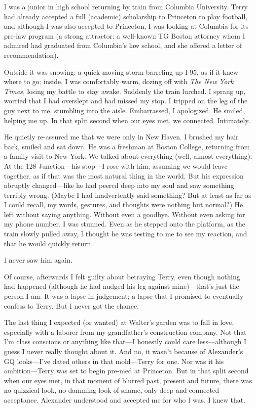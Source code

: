 I was a junior in high school returning by train from Columbia
University. Terry had already accepted a full (academic) scholarship to
Princeton to play football, and although I was also accepted to
Princeton, I was looking at Columbia for its pre-law program (a strong
attractor: a well-known TG Boston attorney whom I admired had graduated
from Columbia's law school, and she offered a letter of recommendation).

Outside it was snowing: a quick-moving storm barreling up I-95, as if it
knew where to go; inside, I was comfortably warm, dozing off with
\emph{The New York Times,} losing my battle to stay awake. Suddenly the
train lurched. I sprang up, worried that I had overslept and had missed
my stop. I tripped on the leg of the guy next to me, stumbling into the
aisle. Embarrassed, I apologized. He smiled, helping me up. In that
split second when our eyes met, we connected. Intimately.

He quietly re-assured me that we were only in New Haven. I brushed my
hair back, smiled and sat down. He was a freshman at Boston College,
returning from a family visit to New York. We talked about everything
(well, almost everything). At the 128 Junction---his stop---I rose with
him, assuming we would leave together, as if that was the most natural
thing in the world. But his expression abruptly changed---like he had
peered deep into my soul and saw something terribly wrong. (Maybe I had
inadvertently said something? But at least as far as I could recall, my
words, gestures, and thoughts were nothing but normal?) He left without
saying anything. Without even a goodbye. Without even asking for my
phone number. I was stunned. Even as he stepped onto the platform, as
the train slowly pulled away, I thought he was testing to me to see my
reaction, and that he would quickly return.

I never saw him again.

Of course, afterwards I felt guilty about betraying Terry, even though
nothing had happened (although he had nudged his leg against
mine)---that's just the person I am. It was a lapse in judgement; a
lapse that I promised to eventually confess to Terry. But I never got
the chance.

The last thing I expected (or wanted) at Walter's garden was to fall in
love, especially with a laborer from my grandfather's construction
company. Not that I'm class conscious or anything like that---I honestly
could care less---although I guess I never really thought about it. And
no, it wasn't because of Alexander's GQ looks---I've dated others in
that mold---Terry for one. Nor was it his ambition---Terry was set to
begin pre-med at Princeton. But in that split second when our eyes met,
in that moment of blurred past, present and future, there was no
quizzical look, no damming look of shame, only deep and connected
acceptance. Alexander understood and accepted me for who I was. I knew
that.

